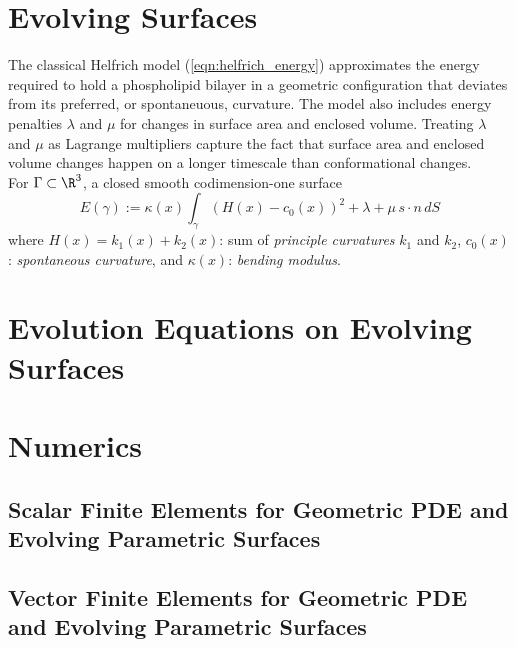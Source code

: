 \documentclass[10pt]{article}
\begin{document}
\section{Evolving Surfaces}

The classical Helfrich model (\ref{eqn:helfrich_energy}) approximates the energy
required to hold a phospholipid bilayer in a geometric configuration that
deviates from its preferred, or spontaneuous, curvature. The model also
includes energy penalties $\lambda$ and
$\mu$ for changes in surface area and enclosed volume. Treating $\lambda$ and
$\mu$ as Lagrange multipliers capture the fact that surface area and enclosed
volume changes happen on a longer timescale than conformational changes.\\



For $\Gamma \subset \R^3$, a closed smooth codimension-one surface
\begin{equation}
   E({\gamma}) := \kappa(x) \int_{\gamma} \left( H(x) - c_{0}(x)\right)^2  + \lambda + \mu\, s
\cdot n \, dS 
   \label{eqn:helfrich_energy}
\end{equation}
where $H(x) = k_1(x) + k_2(x)$: sum of \emph{principle curvatures} $k_1$ and
$k_2$, $c_0(x)$: \emph{spontaneous curvature}, and $\kappa(x)$: \emph{bending
modulus}.


\cite{DoganNochetto:2012}


\section{Evolution Equations on Evolving Surfaces}



\section{Numerics}

\subsection{Scalar Finite Elements for Geometric PDE and Evolving Parametric Surfaces}

\subsection{Vector Finite Elements for Geometric PDE and Evolving Parametric Surfaces}
\end{document}

